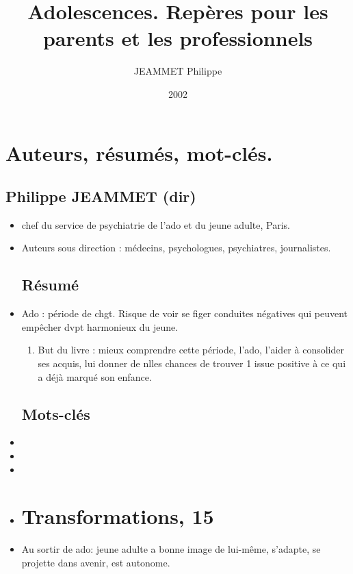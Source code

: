 \documentclass[12pt]{report}
\title{Adolescences. Repères pour les parents et les professionnels}
\author{JEAMMET Philippe}
\date{2002}
\begin{document}
\maketitle


\tableofcontents

\chapter*{Auteurs, résumés, mot-clés.}

\section*{Philippe JEAMMET (dir)}

\begin{itemize}
\item chef du service de psychiatrie de l'ado et du jeune adulte, Paris. \\
\item Auteurs sous direction : médecins, psychologues, psychiatres, journalistes. \\

\section*{Résumé}
\item Ado : période de chgt. Risque de voir se figer conduites négatives qui peuvent empêcher dvpt harmonieux du jeune.
\begin{enumerate}
\item But du livre : mieux comprendre cette période, l'ado, l'aider à consolider ses acquis, lui donner de nlles chances de trouver 1 issue positive à ce qui a déjà marqué son enfance.
\end{enumerate}

\section*{Mots-clés}
\item 
\item 
\item 
\item 

\chapter{Transformations, 15}

\item Au sortir de ado: jeune adulte a bonne image de lui-même, s'adapte, se projette dans avenir, est autonome. \\


\end{itemize}
\end{document}
